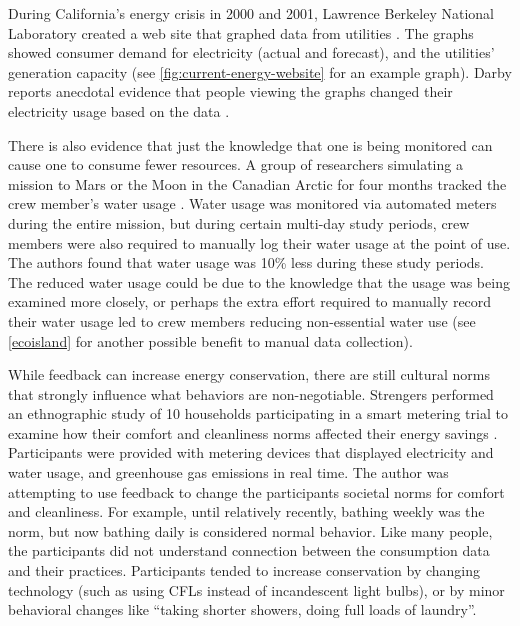 During California's energy crisis in 2000 and 2001, Lawrence Berkeley National Laboratory created a web site that graphed data from utilities \cite{Bartholomew2008Current-Energy}. The graphs showed consumer demand for electricity (actual and forecast), and the utilities' generation capacity (see \autoref{fig:current-energy-website} for an example graph). Darby reports anecdotal evidence that people viewing the graphs changed their electricity usage based on the data \cite{darby-review-2006}.

There is also evidence that just the knowledge that one is being monitored can cause one to consume fewer resources. A group of researchers simulating a mission to Mars or the Moon in the Canadian Arctic for four months tracked the crew member's water usage \cite{Bamsey2008FMARS}. Water usage was monitored via automated meters during the entire mission, but during certain multi-day study periods, crew members were also required to manually log their water usage at the point of use. The authors found that water usage was 10\% less during these study periods. The reduced water usage could be due to the knowledge that the usage was being examined more closely, or perhaps the extra effort required to manually record their water usage led to crew members reducing non-essential water use (see \autoref{ecoisland} for another possible benefit to manual data collection).

While feedback can increase energy conservation, there are still cultural norms that strongly influence what behaviors are non-negotiable. Strengers performed an ethnographic study of 10 households participating in a smart metering trial to examine how their comfort and cleanliness norms affected their energy savings \cite{strengers-comfort-norms-2008}. Participants were provided with metering devices that displayed electricity and water usage, and greenhouse gas emissions in real time. The author was attempting to use feedback to change the participants societal norms for comfort and cleanliness. For example, until relatively recently, bathing weekly was the norm, but now bathing daily is considered normal behavior. Like many people, the participants did not understand connection between the consumption data and their practices. Participants tended to increase conservation by changing technology (such as using CFLs instead of incandescent light bulbs), or by minor behavioral changes like ``taking shorter showers, doing full loads of laundry''.

